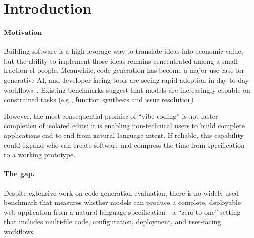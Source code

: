 

\maketitle

\section{Introduction}

\paragraph{Motivation}
Building software is a high-leverage way to translate ideas into economic value, but the ability to implement those ideas remains concentrated among a small fraction of people. Meanwhile, code generation has become a major use case for generative AI, and developer-facing tools are seeing rapid adoption in day-to-day workflows~\cite{peng2023copilot, stackoverflow2024survey}. Existing benchmarks suggest that models are increasingly capable on constrained tasks (e.g., function synthesis and issue resolution)~\cite{chen2021codex, austin2021program, jimenez2024swebench, jain2024livecodebench}.

However, the most consequential promise of ``vibe coding'' is not faster completion of isolated edits; it is enabling non-technical users to build complete applications end-to-end from natural language intent. If reliable, this capability could expand who can create software and compress the time from specification to a working prototype.

\paragraph{The gap.}
Despite extensive work on code generation evaluation, there is no widely used benchmark that measures whether models can produce a complete, deployable web application from a natural language specification---a ``zero-to-one'' setting that includes multi-file code, configuration, deployment, and user-facing workflows.

